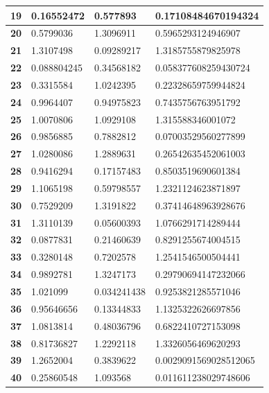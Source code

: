 \documentclass{article}
\begin{document}
\begin{table}[H]
\begin{tabular}{|l|l|l|l|}
        \textbf{19} & 0.16552472 & 0.577893 & 0.17108484670194324 \\ \hline
        \textbf{20} & 0.5799036 & 1.3096911 & 0.5965293124946907 \\ \hline
        \textbf{21} & 1.3107498 & 0.09289217 & 1.3185755879825978 \\ \hline
        \textbf{22} & 0.088804245 & 0.34568182 & 0.058377608259430724 \\ \hline
        \textbf{23} & 0.3315584 & 1.0242395 & 0.22328659759944824 \\ \hline
        \textbf{24} & 0.9964407 & 0.94975823 & 0.7435756763951792 \\ \hline
        \textbf{25} & 1.0070806 & 1.0929108 & 1.315588346001072 \\ \hline
        \textbf{26} & 0.9856885 & 0.7882812 & 0.07003529560277899 \\ \hline
        \textbf{27} & 1.0280086 & 1.2889631 & 0.26542635452061003 \\ \hline
        \textbf{28} & 0.9416294 & 0.17157483 & 0.8503519690601384 \\ \hline
        \textbf{29} & 1.1065198 & 0.59798557 & 1.2321124623871897 \\ \hline
        \textbf{30} & 0.7529209 & 1.3191822 & 0.37414648963928676 \\ \hline
        \textbf{31} & 1.3110139 & 0.05600393 & 1.0766291714289444 \\ \hline
        \textbf{32} & 0.0877831 & 0.21460639 & 0.8291255674004515 \\ \hline
        \textbf{33} & 0.3280148 & 0.7202578 & 1.2541546500504441 \\ \hline
        \textbf{34} & 0.9892781 & 1.3247173 & 0.29790694147232066 \\ \hline
        \textbf{35} & 1.021099 & 0.034241438 & 0.9253821285571046 \\ \hline
        \textbf{36} & 0.95646656 & 0.13344833 & 1.1325322626697856 \\ \hline
        \textbf{37} & 1.0813814 & 0.48036796 & 0.6822410727153098 \\ \hline
        \textbf{38} & 0.81736827 & 1.2292118 & 1.3326056469620293 \\ \hline
        \textbf{39} & 1.2652004 & 0.3839622 & 0.0029091569028512065 \\ \hline
        \textbf{40} & 0.25860548 & 1.093568 & 0.011611238029748606 \\ \hline
    \end{tabular}
\end{table}
\end{document}
